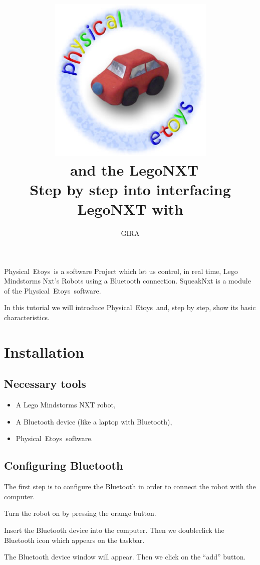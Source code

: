 \documentclass[english]{etoys-guide}
\title{
	\includegraphics[width=8cm]{../../shared/images/physical_etoys_logo.jpg}\\
	\vfill
	\vspace{3em}
	\LARGE{\textbf{\appName~and the LegoNXT}}\\[1cm]
	\large{Step by step into interfacing LegoNXT with \appName}\\[1cm]
	\vfill
}
\author{
GIRA
}
\def\appName{Physical~Etoys~}
\begin{document}

\maketitle

\cleardoublepage
\tableofcontents
\cleardoublepage


\appName is a software Project which let us control, in real time, Lego
Mindstorms Nxt’s Robots using a Bluetooth connection. SqueakNxt is a module of
the \appName software.

In this tutorial we will introduce \appName and, step by step, show its basic
characteristics. 


\section{Installation}

\subsection{Necessary tools}

\begin{itemize}
	\item A Lego Mindstorms NXT robot,
	\item A Bluetooth device (like a laptop with Bluetooth),
	\item \appName software.
\end{itemize}

\subsection{Configuring Bluetooth} 

The first step is to configure the Bluetooth in order to connect the robot with
the computer.

Turn the robot on by pressing the orange button.


Insert the Bluetooth device into the computer. Then we doubleclick the
Bluetooth icon which appears on the taskbar.



The Bluetooth device window will appear. Then we click on the “add” button.
\end{document}
